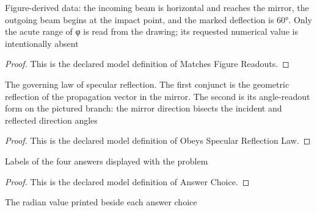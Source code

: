 \begin{definition}
  \label{def:physics:phyx-mini-0060:phyxminiproblems-problemphyxmini0060-matchesfigurereadouts}
  Figure-derived data: the incoming beam is horizontal and reaches the mirror, the outgoing beam begins at the impact point, and the marked deflection is 60°. Only the acute range of φ is read from the drawing; its requested numerical value is intentionally absent
\end{definition}
\begin{proof}
  This is the declared model definition of Matches Figure Readouts.
\end{proof}
\begin{definition}
  \label{def:physics:phyx-mini-0060:phyxminiproblems-problemphyxmini0060-obeysspecularreflectionlaw}
  The governing law of specular reflection. The first conjunct is the geometric reflection of the propagation vector in the mirror. The second is its angle-readout form on the pictured branch: the mirror direction bisects the incident and reflected direction angles
\end{definition}
\begin{proof}
  This is the declared model definition of Obeys Specular Reflection Law.
\end{proof}
\begin{definition}
  \label{def:physics:phyx-mini-0060:phyxminiproblems-problemphyxmini0060-answerchoice}
  Labels of the four answers displayed with the problem
\end{definition}
\begin{proof}
  This is the declared model definition of Answer Choice.
\end{proof}
\begin{definition}
  \label{def:physics:phyx-mini-0060:phyxminiproblems-problemphyxmini0060-answerangleradians}
  The radian value printed beside each answer choice
\end{definition}
